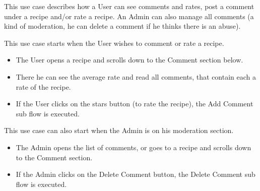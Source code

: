 {
  This use case describes how a User can see comments and rates, post a comment under a recipe and/or rate a recipe. An Admin can also manage all comments (a kind of moderation, he can delete a comment if he thinks there is an abuse).

  \clearpage
}
{
  \begin{multicols}{2}
    This use case starts when the User wishes to comment or rate a recipe.
    \begin{itemize}
      \item The User opens a recipe and scrolls down to the Comment section below.
      \item There he can see the average rate and read all comments, that contain each a rate of the recipe.
      \item If the User clicks on the stars button (to rate the recipe), the Add Comment sub flow is executed.
    \end{itemize}

    \columnbreak
  
    This use case can also start when the Admin is on his moderation section.
    \begin{itemize}
      \item The Admin opens the list of comments, or goes to a recipe and scrolls down to the Comment section.
      \item If the Admin clicks on the Delete Comment button, the Delete Comment sub flow is executed.
    \end{itemize}
  \end{multicols}

}
